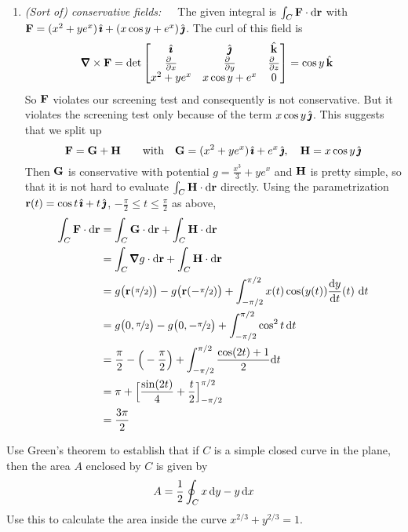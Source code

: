 \begin{solution}
\begin{enumerate}[(1)]
\item \emph{(Sort of) conservative fields:}\ \ \ The given integral
is $\int_C\mathbf{F}\cdot\mathrm{d}\mathbf{r}$ with 
$\mathbf{F} = (x^2 + y e^x ) \,\hat{\pmb{\imath}} + (x \cos y + e^x ) \,\hat{\pmb{\jmath}}$. The curl of this
field is
\begin{align*}
\vnabla\times\vF
&=\det\left[\begin{matrix}
\hi &\hj &\hk \\
\tfrac{\partial\hfill}{\partial x} & \tfrac{\partial\hfill}{\partial y} & 
                \tfrac{\partial\hfill}{\partial z} \\
x^2 + y e^x & x \cos y + e^x & 0
\end{matrix}
\right]
=\cos y\,\hk
\end{align*}
So $\mathbf{F}$ violates our screening test and consequently is not conservative.
But it violates the screening test only because of the term $x\cos y\,\hat{\pmb{\jmath}}$.
This suggests that we split up 
\begin{equation*}
\mathbf{F} = \mathbf{G} +\mathbf{H}\qquad\text{with}\quad
\mathbf{G}= (x^2 + y e^x ) \,\hat{\pmb{\imath}} + e^x \,\hat{\pmb{\jmath}},\quad
\mathbf{H} = x\cos y\,\hat{\pmb{\jmath}}
\end{equation*}
Then $\mathbf{G}$ is conservative with potential $g=\frac{x^3}{3}+ye^x$
and $\mathbf{H}$ is pretty simple, so that it is not hard to evaluate 
$\int_C\mathbf{H}\cdot\mathrm{d}\mathbf{r}$ directly. Using the parametrization 
$\mathbf{r}(t) = \cos t\,\hat{\pmb{\imath}} + t\,\hat{\pmb{\jmath}}$,  $-\frac{\pi}{2}\le t\le\frac{\pi}{2}$
as above,
\begin{align*}
\int_C\vF\cdot\dee{\vr}
&= \int_C\vG\cdot\dee{\vr} + \int_C\vH\cdot\dee{\vr} \\
&= \int_C\vnabla g\cdot\dee{\vr} + \int_C\vH\cdot\dee{\vr} \\
&=g\big(\vr(\nicefrac{\pi}{2})\big) -g\big(\vr(-\nicefrac{\pi}{2})\big)
   + \int_{-\pi/2}^{\pi/2} x(t) \cos(y(t)) \diff{y}{t}(t)\ \dee{t} \\
& =g\big(0,\nicefrac{\pi}{2}\big) -g\big(0,-\nicefrac{\pi}{2}\big)
   +\int_{-\pi/2}^{\pi/2} \cos^2 t \,\dee{t} \\
&=\frac{\pi}{2} -\Big(-\frac{\pi}{2}\Big)
   +\int_{-\pi/2}^{\pi/2} \frac{\cos(2t)+1}{2} \dee{t} \\
&=\pi  + \Big[ \frac{\sin(2t)}{4} +\frac{t}{2}\Big]_{-\pi/2}^{\pi/2} \\
&=\frac{3\pi}{2}
\end{align*}

\end{enumerate}

\end{solution}

\begin{question}[M317 2004A] %
 Use Green's theorem to establish that if $C$ is a simple
closed curve in the plane, then the area $A$ enclosed by $C$ is given by
\begin{equation*}
A=\frac{1}{2}\oint_C x\,\mathrm{d}y-y\,\mathrm{d}x
\end{equation*}
Use this to calculate the area inside the curve 
$x^{2/3}+y^{2/3}=1$.
\end{question}

